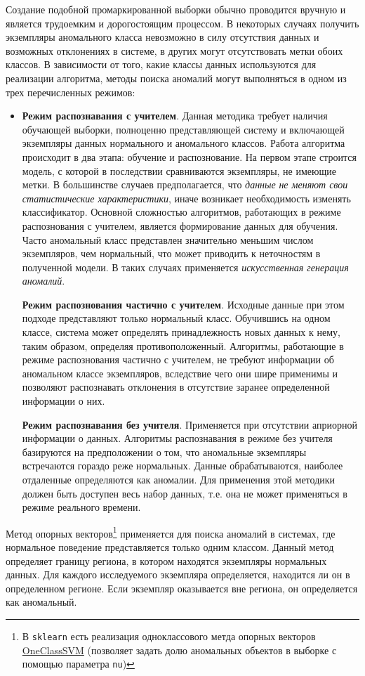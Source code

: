 \documentclass[%
	11pt,
	a4paper,
	utf8,
		]{article}
\begin{document}
Создание подобной промаркированной выборки обычно проводится вручную и является трудоемким и дорогостоящим процессом. В некоторых случаях получить экземпляры аномального класса невозможно в силу отсутствия данных и возможных отклонениях в системе, в других могут отсутствовать метки обоих классов. В зависимости от того, какие классы данных используются для реализации алгоритма, методы поиска аномалий могут выполняться в одном из трех перечисленных режимов:
\begin{itemize}
	\item \textbf{Режим распознавания с учителем}. Данная методика требует наличия обучающей выборки, полноценно представляющей систему и включающей экземпляры данных нормального и аномального классов. Работа алгоритма происходит в два этапа: обучение и распознование. На первом этапе строится модель, с которой в последствии сравниваются экземпляры, не имеющие метки. В большинстве случаев предполагается, что \emph{данные} \emph{не меняют свои статистические характеристики}, иначе возникает необходимость изменять классификатор. Основной сложностью алгоритмов, работающих в режиме распознования с учителем, является формирование данных для обучения. Часто аномальный класс представлен значительно меньшим числом экземпляров, чем нормальный, что может приводить к неточностям в полученной модели. В таких случаях применяется \emph{искусственная генерация аномалий}.
	
	\textbf{Режим распознования частично с учителем}. Исходные данные при этом подходе представляют только нормальный класс. Обучившись на одном классе, система может определять принадлежность новых данных к нему, таким образом, определяя противоположенный. Алгоритмы, работающие в режиме распознования частично с учителем, не требуют информации об аномальном классе экземпляров, вследствие чего они шире применимы и позволяют распознавать отклонения в отсутствие заранее определенной информации о них.
	
	\textbf{Режим распознавания без учителя}. Применяется при отсутствии априорной информации о данных. Алгоритмы распознавания в режиме без учителя базируются на предположении о том, что аномальные экземпляры встречаются гораздо реже нормальных. Данные обрабатываются, наиболее отдаленные определяются как аномалии. Для применения этой методики должен быть доступен весь набор данных, т.е. она не может применяться в режиме реального времени.
\end{itemize}

Метод опорных векторов\footnote{В \texttt{sklearn} есть реализация одноклассового метда опорных векторов \href{https://scikit-learn.org/stable/modules/generated/sklearn.svm.OneClassSVM.html}{\ttfamily OneClassSVM} (позволяет задать долю аномальных объектов в выборке с помощью параметра \texttt{nu})} применяется для поиска аномалий в системах, где нормальное поведение представляется только одним классом. Данный метод определяет границу региона, в котором находятся экземпляры нормальных данных. Для каждого исследуемого экземпляра определяется, находится ли он в определенном регионе. Если экземпляр оказывается вне региона, он определяется как аномальный.
\end{document}
